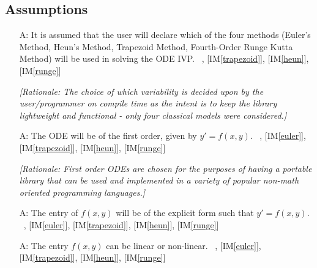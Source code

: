 \documentclass[12pt]{article}
\newcommand{\tref}[1]{T\ref{#1}}
\newcounter{assumpnum} %
\newcommand{\iref}[1]{IM\ref{#1}}
\begin{document}
\subsection{Assumptions} \label{sec_Assumptions}

\begin{itemize}


\item[A\refstepcounter{assumpnum}\theassumpnum \label{A_programcalls}:]
It is assumed that the user will declare which of the four methods (Euler's Method, Heun's
Method, Trapezoid Method, Fourth-Order Runge Kutta Method) will be used in solving
the ODE IVP.
~\newline
[\iref{euler}], [\iref{trapezoid}], [\iref{heun}], [\iref{runge}]

\textit{[Rationale: The choice of which variability is decided upon by the user/programmer
on compile time as the intent is to keep the library lightweight and functional - only four
classical models were considered.]}

\item[A\refstepcounter{assumpnum}\theassumpnum \label{A_typeoff}:]
The ODE will be of the first order, given by $y' = f(x, y)$.
~\newline
[\tref{T_ODE}], [\iref{euler}], [\iref{trapezoid}], [\iref{heun}], [\iref{runge}]

\textit{[Rationale: First order ODEs are chosen for the purposes of having a portable
library that can be used and implemented in a variety of popular non-math oriented programming
languages.]}

\item[A\refstepcounter{assumpnum}\theassumpnum \label{A_explicit}:]
The entry of $f(x, y)$ will be of the explicit form such that $y' = f(x, y)$.
~\newline
[\tref{T_ODE}], [\iref{euler}], [\iref{trapezoid}], [\iref{heun}], [\iref{runge}]

\item[A\refstepcounter{assumpnum}\theassumpnum \label{A_linearity}:]
The entry $f(x, y)$ can be linear or non-linear.
~\newline
[\tref{T_ODE}], [\iref{euler}], [\iref{trapezoid}], [\iref{heun}], [\iref{runge}]


\end{itemize}
\end{document}

